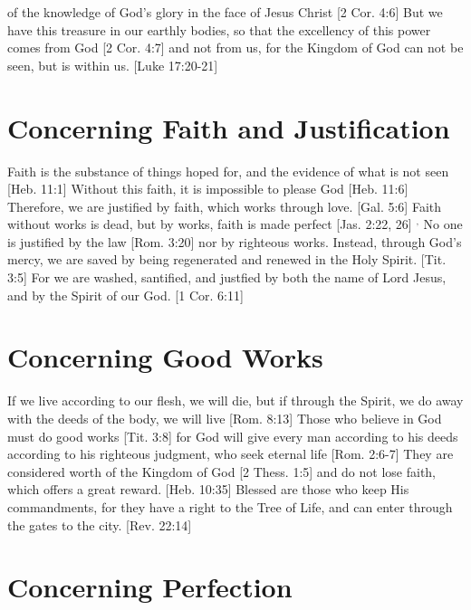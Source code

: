 \documentclass[../main.tex] {subfiles}
\begin{document}
of the knowledge of God's glory in the face of Jesus Christ [2 Cor. 4:6]  But we have this treasure in our earthly bodies, so that the excellency of this power comes from God [2 Cor. 4:7]  and not from us, for the Kingdom of God can not be seen, but is within us. [Luke 17:20-21] 

	\section{Concerning Faith and Justification}

	Faith is the substance of things hoped for, and the evidence of what is not seen [Heb. 11:1]  Without this faith, it is impossible to please God [Heb. 11:6]  Therefore, we are justified by faith, which works through love. [Gal. 5:6]  Faith without works is dead, but by works, faith is made perfect [Jas. 2:22, 26] $^{,}$ No one is justified by the law [Rom. 3:20]  nor by righteous works. Instead, through God's mercy, we are saved by being regenerated and renewed in the Holy Spirit. [Tit. 3:5]  For we are washed, santified, and justfied by both the name of Lord Jesus, and by the Spirit of our God. [1 Cor. 6:11] 

	\section{Concerning Good Works}

	If we live according to our flesh, we will die, but if through the Spirit, we do away with the deeds of the body, we will live [Rom. 8:13]  Those who believe in God must do good works [Tit. 3:8]  for God will give every man according to his deeds according to his righteous judgment, who seek eternal life [Rom. 2:6-7]  They are considered worth of the Kingdom of God [2 Thess. 1:5]  and do not lose faith, which offers a great reward. [Heb. 10:35]  Blessed are those who keep His commandments, for they have a right to the Tree of Life, and can enter through the gates to the city. [Rev. 22:14] 

	\section{Concerning Perfection}
\end{document}
